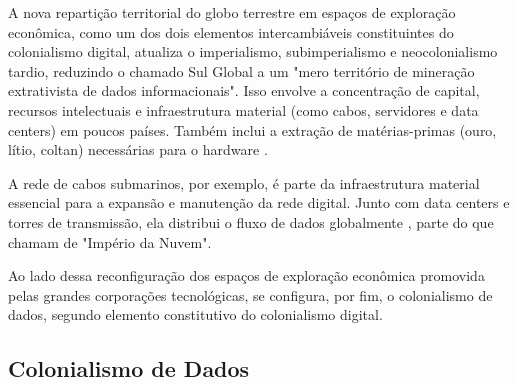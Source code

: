 A nova repartição territorial do globo terrestre em espaços de exploração econômica, como um dos dois elementos intercambiáveis constituintes do colonialismo digital, atualiza o imperialismo, subimperialismo e neocolonialismo tardio, reduzindo o chamado Sul Global a um "mero território de mineração extrativista de dados informacionais". Isso envolve a concentração de capital, recursos intelectuais e infraestrutura material (como cabos, servidores e data centers) em poucos países. Também inclui a extração de matérias-primas (ouro, lítio, coltan) necessárias para o hardware \cite{Faustino2023}.

A rede de cabos submarinos, por exemplo, é parte da infraestrutura material essencial para a expansão e manutenção da rede digital. Junto com data centers e torres de transmissão, ela distribui o fluxo de dados globalmente \cite{Figueiredo2023}, parte do que  chamam de "Império da Nuvem". 


Ao lado dessa reconfiguração dos espaços de exploração econômica promovida pelas grandes corporações tecnológicas, se configura, por fim, o colonialismo de dados, segundo elemento constitutivo do colonialismo digital.

\subsection{Colonialismo de Dados}
\label{subsec:colDados}

